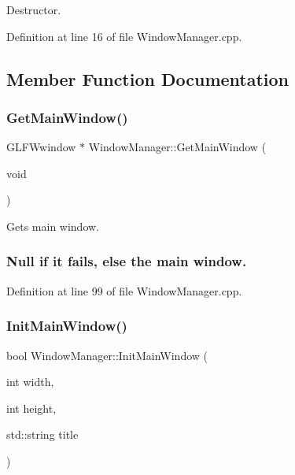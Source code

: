 Destructor. 



Definition at line 16 of file Window\+Manager.\+cpp.



\subsection{Member Function Documentation}
\mbox{\label{class_window_manager_a89a767f4c3a1fd248cad0a2b560420b7}} 
\subsubsection{\texorpdfstring{Get\+Main\+Window()}{GetMainWindow()}}
{\footnotesize\ttfamily G\+L\+F\+Wwindow $\ast$ Window\+Manager\+::\+Get\+Main\+Window (\begin{DoxyParamCaption}\item[{void}]{ }\end{DoxyParamCaption})}



Gets main window. 





\subsubsection*{Null if it fails, else the main window.  }

Definition at line 99 of file Window\+Manager.\+cpp.

\mbox{\label{class_window_manager_acc25a22a88b12463ca20722faa0ad700}} 
\subsubsection{\texorpdfstring{Init\+Main\+Window()}{InitMainWindow()}}
{\footnotesize\ttfamily bool Window\+Manager\+::\+Init\+Main\+Window (\begin{DoxyParamCaption}\item[{int}]{width,  }\item[{int}]{height,  }\item[{std\+::string}]{title }\end{DoxyParamCaption})}



